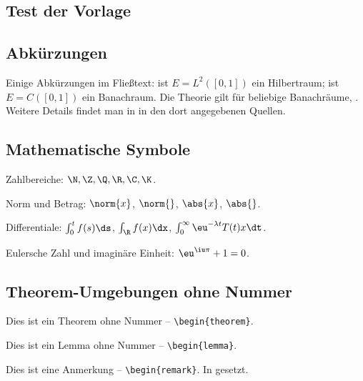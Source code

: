 \begin{refsection}

\section*{Test der Vorlage}

\subsection*{Abkürzungen}

Einige Abkürzungen im Fließtext: \zB ist $E = L^2([0,1])$ ein
Hilbertraum; \bzw ist $E = C([0,1])$ ein Banachraum.
Die Theorie gilt \zB für beliebige Banachräume, \vgl \textcite{alsina:2013}.
Weitere Details findet man \ua in \textcite{takesaki:1958} \bzw in
den dort angegebenen Quellen.

\subsection*{Mathematische Symbole}

Zahlbereiche: $\N, \Z, \Q, \R, \C, \K$.

Norm und Betrag: $\norm{x}$, $\norm{}$, $\abs{x}$, $\abs{}$.

Differentiale: $\int_0^t f(s)\ds$, $\int_\R f(x)\dx$,
$\int_0^\infty \eu^{-\lambda t} T(t)x\dt$.

Eulersche Zahl und imaginäre Einheit: $\eu^{\iu\pi} + 1 = 0$.

\subsection*{Theorem-Umgebungen ohne Nummer}

\begin{theorem}
Dies ist ein Theorem ohne Nummer -- \verb|\begin{theorem}|.
\end{theorem}

\begin{lemma}
Dies ist ein Lemma ohne Nummer -- \verb|\begin{lemma}|.
\end{lemma}

\begin{remark}
Dies ist eine Anmerkung -- \verb|\begin{remark}|.
In \texttt{\small} gesetzt.
\end{remark}


\end{refsection}
